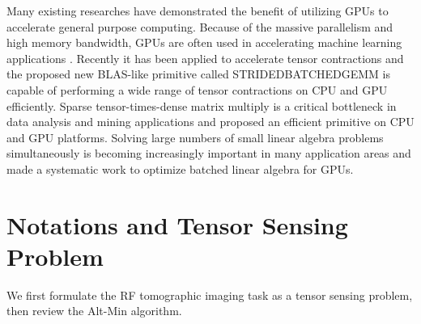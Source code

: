 \documentclass[journal,article,submit,moreauthors,pdftex,10pt,a4paper]{Definitions/mdpi}
\theoremstyle{plain}
\theoremstyle{definition}
\theoremstyle{remark}
\begin{document}
Many existing researches \cite{jing2016energy} \cite{zhang2015buddy} \cite{zhang2015efficient} \cite{zhang2014cuirre} \cite{zhang2016efficient} have demonstrated the benefit of utilizing GPUs to accelerate general purpose computing. Because of the massive parallelism and high memory bandwidth, GPUs are often used in accelerating machine learning applications \cite{chetlur2014cudnn} \cite{tsung2016high} \cite{banasiak2016statistical}.  Recently it has been applied to accelerate tensor contractions \cite{shi2016tensor} and the proposed new BLAS-like primitive called STRIDEDBATCHEDGEMM is capable of performing a wide range of tensor contractions on CPU and GPU efficiently. Sparse tensor-times-dense matrix multiply is a critical bottleneck in data analysis and mining applications and \cite{li2016optimizing} proposed an efficient primitive on CPU and GPU platforms. Solving large numbers of small linear algebra problems simultaneously is becoming increasingly important in many application areas and \cite{dongarra2017optimized} made a systematic work to optimize batched linear algebra for GPUs.

\section{Notations and Tensor Sensing Problem}
    We first formulate the RF tomographic imaging task as a tensor sensing problem, then review the Alt-Min algorithm. 
\end{document}
